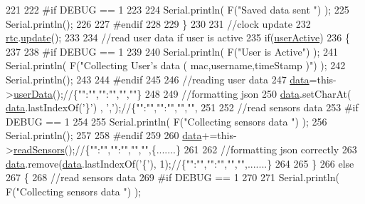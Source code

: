 \begin{DoxyCode}
221     
222 \textcolor{preprocessor}{    #if DEBUG == 1}
223 
224         Serial.println( F(\textcolor{stringliteral}{"Saved data sent "}) );
225         Serial.println();
226     
227 \textcolor{preprocessor}{    #endif}
228 
229     \}
230 
231     \textcolor{comment}{//clock update}
232     \hyperlink{classCoolBoard_a50d2a6716879d64a85f3c6b44ad63275}{rtc}.\hyperlink{classCoolTime_aae601f795452cfa48d9fb337aed483a8}{update}();
233 
234     \textcolor{comment}{//read user data if user is active}
235     \textcolor{keywordflow}{if}(\hyperlink{classCoolBoard_a6395459131d6889a3005f79c7a35e964}{userActive})
236     \{
237     
238 \textcolor{preprocessor}{    #if DEBUG == 1}
239 
240         Serial.println( F(\textcolor{stringliteral}{"User is Active"}) );
241         Serial.println( F(\textcolor{stringliteral}{"Collecting User's data ( mac,username,timeStamp )"}) );
242         Serial.println();
243     
244 \textcolor{preprocessor}{    #endif  }
245     
246         \textcolor{comment}{//reading user data}
247         \hyperlink{classCoolBoard_a427fb753dd8575bdf821c70a5c63d695}{data}=this->\hyperlink{classCoolBoard_ae7358fb6e623cfc81b775f5f1734909b}{userData}();\textcolor{comment}{//\{"":"","":"","",""\}}
248 
249         \textcolor{comment}{//formatting json }
250         \hyperlink{classCoolBoard_a427fb753dd8575bdf821c70a5c63d695}{data}.setCharAt( \hyperlink{classCoolBoard_a427fb753dd8575bdf821c70a5c63d695}{data}.lastIndexOf(\textcolor{charliteral}{'\}'}) , \textcolor{charliteral}{','});\textcolor{comment}{//\{"":"","":"","","",}
251                 
252         \textcolor{comment}{//read sensors data}
253 \textcolor{preprocessor}{    #if DEBUG == 1}
254 
255         Serial.println( F(\textcolor{stringliteral}{"Collecting sensors data "}) );
256         Serial.println();
257     
258 \textcolor{preprocessor}{    #endif}
259 
260         \hyperlink{classCoolBoard_a427fb753dd8575bdf821c70a5c63d695}{data}+=this->\hyperlink{classCoolBoard_ad03abdce2e65f520bbf2cff0f2d083cf}{readSensors}();\textcolor{comment}{//\{"":"","":"","","",\{.......\}     }
261 
262         \textcolor{comment}{//formatting json correctly}
263         \hyperlink{classCoolBoard_a427fb753dd8575bdf821c70a5c63d695}{data}.remove(\hyperlink{classCoolBoard_a427fb753dd8575bdf821c70a5c63d695}{data}.lastIndexOf(\textcolor{charliteral}{'\{'}), 1);\textcolor{comment}{//\{"":"","":"","","",.......\}}
264                 
265     \}   
266     \textcolor{keywordflow}{else}
267     \{
268         \textcolor{comment}{//read sensors data}
269 \textcolor{preprocessor}{    #if DEBUG == 1}
270 
271         Serial.println( F(\textcolor{stringliteral}{"Collecting sensors data "}) );

\end{DoxyCode}
